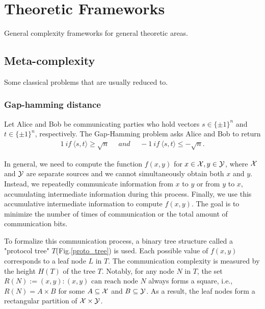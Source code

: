 \chapter{Theoretic Frameworks}
General complexity frameworks for general theoretic areas.


\section{Meta-complexity}
Some classical problems that are usually reduced to.
\subsection{Gap-hamming distance}
\begin{prob}
\label{ghd}
     Let Alice and Bob be communicating parties who hold vectors $s\in\{\pm1\}^n$ and $t\in\{\pm1\}^n$, respectively. The Gap-Hamming problem asks Alice and Bob to return
     \begin{align*}
         1~if~\langle s,t \rangle\ge \sqrt{n}~~~~~~and~~~~~~-1~if~\langle s,t \rangle\le -\sqrt{n}.
     \end{align*}
\end{prob}



In general, we need to compute the function $f(x,y)$ for $x\in \mathcal{X}, y\in\mathcal{Y}$, where $\mathcal{X}$ and $\mathcal{Y}$ are separate sources and we cannot simultaneously obtain both $x$ and $y$. Instead, we repeatedly communicate information from $x$ to $y$ or from $y$ to $x$, accumulating intermediate information during this process. Finally, we use this accumulative intermediate information to compute $f(x,y)$. The goal is to minimize the number of times of communication or the total amount of communication bits.

To formalize this communication process, a binary tree structure called a "protocol tree" $T$(Fig.\ref{proto_tree}) is used. Each possible value of $f(x,y)$ corresponds to a leaf node $L$ in $T$. The communication complexity is measured by the height $H(T)$ of the tree $T$. Notably, for any node $N$ in $T$, the set $R(N):={(x,y):(x,y)\text{ can reach node $N$}}$ always forms a square, i.e., $R(N)=A\times B$ for some $A\subseteq\mathcal{X}$ and $B\subseteq\mathcal{Y}$. As a result, the leaf nodes form a rectangular partition of $\mathcal{X}\times\mathcal{Y}$.

